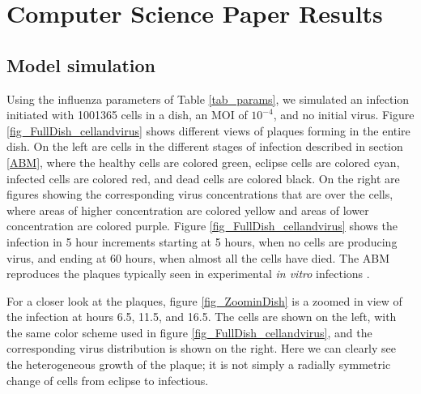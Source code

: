 \section{Computer Science Paper Results}

\subsection{Model simulation}

Using the influenza parameters of Table \ref{tab_params}, we simulated an infection initiated with 1001365 cells in a dish, an MOI of $10^{-4}$, and no initial virus. Figure \ref{fig_FullDish_cellandvirus} shows different views of plaques forming in the entire dish. On the left are cells in the different stages of infection described in section \ref{ABM}, where the healthy cells are colored green, eclipse cells are colored cyan, infected cells are colored red, and dead cells are colored black. On the right are figures showing the corresponding virus concentrations that are over the cells, where areas of higher concentration are colored yellow and areas of lower concentration are colored purple. Figure \ref{fig_FullDish_cellandvirus} shows the infection in 5 hour increments starting at 5 hours, when no cells are producing virus, and ending at 60 hours, when almost all the cells have died. The ABM reproduces the plaques typically seen in experimental \emph{in vitro} infections \cite{holder11H274Y}. 

For a closer look at the plaques, figure \ref{fig_ZoominDish} is a zoomed in view of the infection at hours 6.5, 11.5, and 16.5. The cells are shown on the left, with the same color scheme used in figure \ref{fig_FullDish_cellandvirus}, and the corresponding virus distribution is shown on the right. Here we can clearly see the heterogeneous growth of the plaque; it is not simply a radially symmetric change of cells from eclipse to infectious. 

